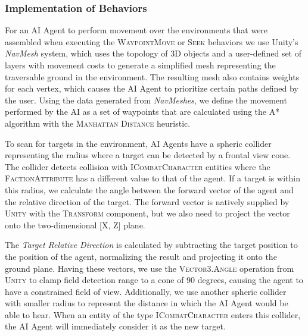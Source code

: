 
\subsubsection{Implementation of Behaviors}

For an AI Agent to perform movement over the environments that were assembled when executing the \textsc{WaypointMove} or \textsc{Seek} behaviors we use Unity's \emph{NavMesh} system, which uses the topology of 3D objects and a user-defined set of layers with movement costs to generate a simplified mesh representing the traversable ground in the environment. The resulting mesh also contains weights for each vertex, which causes the AI Agent to prioritize certain paths defined by the user. Using the data generated from \emph{NavMeshes}, we define the movement performed by the AI as a set of waypoints that are calculated using the \textsc{A*} algorithm with the \textsc{Manhattan Distance} heuristic.


To scan for targets in the environment, AI Agents have a spheric collider representing the radius where a target can be detected by a frontal view cone. The collider detects collision with \textsc{ICombatCharacter} entities where the \textsc{FactionAttribute} has a different value to that of the agent. If a target is within this radius, we calculate the angle between the forward vector of the agent and the relative direction of the target. The forward vector is natively supplied by \textsc{Unity} with the \textsc{Transform} component, but we also need to project the vector onto the two-dimensional [X, Z] plane.

The \emph{Target Relative Direction} is calculated by subtracting the target position to the position of the agent, normalizing the result and projecting it onto the ground plane. Having these vectors, we use the \textsc{Vector3.Angle} operation from \textsc{Unity} to clamp field detection range to a cone of 90 degrees, causing the agent to have a constrained field of view. Additionally, we use another spheric collider with smaller radius to represent the distance in which the AI Agent would be able to hear. When an entity of the type \textsc{ICombatCharacter} enters this collider, the AI Agent will immediately consider it as the new target.


